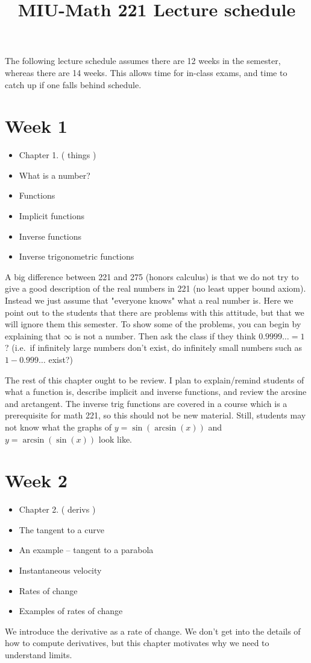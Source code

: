 \documentclass{amsproc}
\begin{document}
\title{MIU-Math 221 Lecture schedule}
\maketitle
The following lecture schedule assumes there are 12 weeks in the semester,
whereas there are 14 weeks.  This allows time for in-class exams, and time to
catch up if one falls behind schedule.
\section*{Week 1}
\begin{itemize}
\item Chapter 1. ( things )
\item What is a number?
\item Functions
\item Implicit functions
\item Inverse functions
\item Inverse trigonometric functions
\end{itemize}
A big  difference between 221 and 275 (honors calculus) is that we do not try to
give a good description of the real numbers in 221 (no least upper bound axiom).
Instead we just assume that "everyone knows" what a real number is.  Here we
point out to the students that there are problems with this attitude, but that
we will ignore them this semester.  To show some of the problems, you can begin
by explaining that $\infty$ is not a number.  Then ask the class if they think
$0.9999\ldots =1$? (i.e.~if infinitely large numbers don't exist, do infinitely
small numbers such as $1-0.999\ldots$ exist?)

The rest of this chapter ought to be review.  I plan to explain/remind students of what a
function is, describe implicit and inverse functions, and review the arcsine and
arctangent.  The inverse trig functions are covered in a course which is a
prerequisite for math 221, so this should not be new material.  Still, students
may not know what the graphs of $y=\sin(\arcsin(x))$ and $y = \arcsin(\sin(x))$ look
like.


\section*{Week 2}
\begin{itemize}
\item Chapter 2. ( derivs )
\item The tangent to a curve
\item An example -- tangent to a parabola
\item Instantaneous velocity
\item Rates of change
\item Examples of rates of change
\end{itemize}
We introduce the derivative as a rate of change.  We don't get into the details
of how to compute derivatives, but this chapter motivates why we need to
understand limits.
\end{document}
